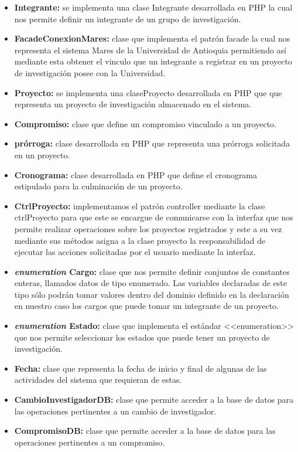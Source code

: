 \documentclass[12pt,oneside,letterpaper]{report}
\begin{document}
\begin{itemize}
 \item \textbf{Integrante:} se implementa una clase Integrante desarrollada en PHP la cual nos permite definir un integrante de un grupo de investigación.
 \item \textbf{FacadeConexionMares:} clase que implementa el patrón facade la cual nos representa el sistema Mares de la Universidad de Antioquia permitiendo así mediante esta obtener el vinculo que un integrante a registrar en un proyecto de investigación posee con la Universidad.
 \item \textbf{Proyecto:} se implementa una claseProyecto desarrollada en PHP que que representa un proyecto de investigación almacenado en el sistema.
 \item \textbf{Compromiso:} clase que define un compromiso vinculado a un proyecto.
 \item \textbf{prórroga:} clase desarrollada en PHP que representa una prórroga solicitada en un proyecto.
 \item \textbf{Cronograma:} clase desarrollada en PHP que define el cronograma estipulado para la culminación de un proyecto.
 \item \textbf{CtrlProyecto:} implementamos el patrón controller mediante la clase ctrlProyecto para que este se encargue de comunicarse con la interfaz que nos permite realizar operaciones sobre los proyectos registrados y este a su vez mediante sus métodos asigna a la clase proyecto la responsabilidad de ejecutar las acciones solicitadas por el usuario mediante la interfaz.
 \item \textbf{\textit{enumeration} Cargo:} clase que nos permite definir conjuntos de constantes enteras, llamados datos de tipo enumerado. Las variables declaradas de este tipo sólo podrán tomar valores dentro del dominio definido en la declaración en nuestro caso los cargos que puede tomar un integrante de un proyecto.
 \item \textbf{\textit{enumeration} Estado:} clase que implementa el estándar <<enumeration>> que nos permite seleccionar los estados que puede tener un proyecto de investigación.
 \item \textbf{Fecha:} clase que representa la fecha de inicio y final de algunas de las actividades del sistema que requieran de estas.
 \item \textbf{CambioInvestigadorDB:} clase que permite acceder a la base de datos para las operaciones pertinentes a un cambio de investigador.
 \item \textbf{CompromisoDB:} clase que permite acceder a la base de datos para las operaciones pertinentes a un compromiso.

\end{itemize}
\end{document}
